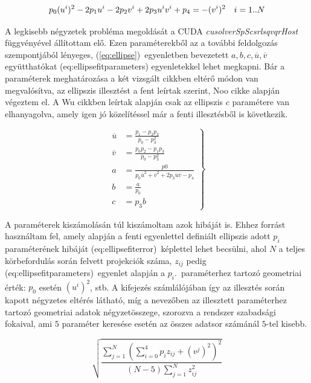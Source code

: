 \documentclass[a4paper,12pt]{article}
\begin{document}
\begin{equation}
\label{eq:ellipsefit}
p_0 (u^i)^2 - 2p_1u^i - 2p_2v^i + 2p_3u^iv^i + p_4 = -(v^i)^2 \hskip10pt i=1..N
\end{equation}

A legkisebb négyzetek probléma megoldását a CUDA \emph{cusolverSpScsrlsqvqrHost} függvényével állítottam elő. Ezen paraméterekből az  a további feldolgozás szempontjából lényeges, (\ref{eq:ellipse})~egyenletben bevezetett $a,b,c,\overline{u},\overline{v}$ együtthatókat \aref({eq:ellipsefitparameters}) egyenletekkel lehet megkapni. Bár a paraméterek meghatározása a két vizsgált cikkben eltérő módon van megvalósítva, az ellipszis illesztést a fent leírtak szerint, Noo \cite{noo} cikke alapján végeztem el. A Wu \cite{wu} cikkben leírtak alapján csak az ellipszis $c$ paramétere van elhanyagolva, amely igen jó közelítéssel már a fenti illesztésből is következik. 


\begin{equation}
\label{eq:ellipsefitparameters}
\left .
\begin{split}
\overline{u} &= \frac{p_1-p_2p_3}{p_0-p_3^2}\\
\overline{v} &= \frac{p_0p_2-p_1p_3}{p_0-p_3^2}\\
a &= \frac{p0}{p_0\overline{u}^2 + \overline{v}^2 + 2p_3\overline{u} \overline{v} - p_4} \\
b &= \frac{a}{p_0}\\
c &=p_3b
\end{split}
\right  \}
\end{equation}


A paraméterek kiszámolásán túl kiszámoltam azok hibáját is. Ehhez   forrást használtam fel, amely alapján a fenti egyenlettel definiált ellipszis adott $p_i$ paraméterének hibáját \aref({eq:ellipsefiterror})~képlettel lehet becsülni, ahol $N$ a teljes körbefordulás során felvett projekciók száma, $z_{ij}$ pedig \aref({eq:ellipsefitparameters})~egyenlet alapján
 a $p_i$.\ paraméterhez tartozó geometriai érték: $p_0$ esetén $\left(u^i\right)^2$, stb. A kifejezés számlálójában így az illesztés során kapott négyzetes eltérés látható, míg a nevezőben az illesztett paraméterhez tartozó geometriai adatok négyzetösszege, szorozva a rendszer szabadsági fokaival, ami $5$ paraméter keresése esetén az összes adatsor számánál $5$-tel kisebb.


\begin{equation}
\label{eq:ellipsefiterror}
\sqrt{\frac{\sum_{j=1}^N \left ( \sum_{i=0}^4 p_i z_{ij} + \left (v^j \right)^2 \right)^2 }{(N-5) \sum_{j=1}^N z_{ij} ^2 }}
\end{equation}
\end{document}
